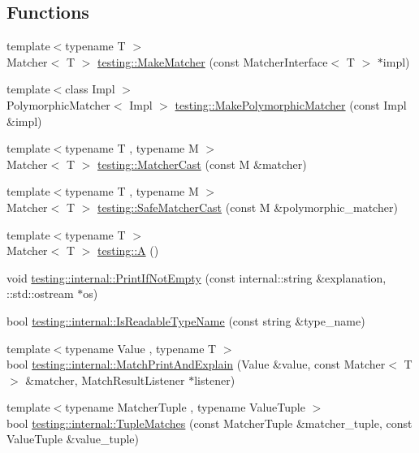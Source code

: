 \subsection*{Functions}
\begin{DoxyCompactItemize}
\item 
{\footnotesize template$<$typename T $>$ }\\Matcher$<$ T $>$ \hyperlink{namespacetesting_a37fd8029ac00e60952440a3d9cca8166}{testing\+::\+Make\+Matcher} (const Matcher\+Interface$<$ T $>$ $\ast$impl)
\item 
{\footnotesize template$<$class Impl $>$ }\\Polymorphic\+Matcher$<$ Impl $>$ \hyperlink{namespacetesting_a667ca94f190ec2e17ee2fbfdb7d3da04}{testing\+::\+Make\+Polymorphic\+Matcher} (const Impl \&impl)
\item 
{\footnotesize template$<$typename T , typename M $>$ }\\Matcher$<$ T $>$ \hyperlink{namespacetesting_a8234d15eee99b135a7fdf2141a2ebe1f}{testing\+::\+Matcher\+Cast} (const M \&matcher)
\item 
{\footnotesize template$<$typename T , typename M $>$ }\\Matcher$<$ T $>$ \hyperlink{namespacetesting_ac016ac22aa065a19b9ef95f0ccffc17b}{testing\+::\+Safe\+Matcher\+Cast} (const M \&polymorphic\+\_\+matcher)
\item 
{\footnotesize template$<$typename T $>$ }\\Matcher$<$ T $>$ \hyperlink{namespacetesting_a5e9134d655d2fc9323902348083282e7}{testing\+::A} ()
\item 
void \hyperlink{namespacetesting_1_1internal_afa4cd5d7933878d6d820b32c87bb2767}{testing\+::internal\+::\+Print\+If\+Not\+Empty} (const internal\+::string \&explanation, \+::std\+::ostream $\ast$os)
\item 
bool \hyperlink{namespacetesting_1_1internal_a19a5d50382569ce6ee94e2b68ddc6fc7}{testing\+::internal\+::\+Is\+Readable\+Type\+Name} (const string \&type\+\_\+name)
\item 
{\footnotesize template$<$typename Value , typename T $>$ }\\bool \hyperlink{namespacetesting_1_1internal_a0821df2611d54c79bac990719ad8a2dd}{testing\+::internal\+::\+Match\+Print\+And\+Explain} (Value \&value, const Matcher$<$ T $>$ \&matcher, Match\+Result\+Listener $\ast$listener)
\item 
{\footnotesize template$<$typename Matcher\+Tuple , typename Value\+Tuple $>$ }\\bool \hyperlink{namespacetesting_1_1internal_a10095d1e1c99369200072b39d657ebc4}{testing\+::internal\+::\+Tuple\+Matches} (const Matcher\+Tuple \&matcher\+\_\+tuple, const Value\+Tuple \&value\+\_\+tuple)

\end{DoxyCompactItemize}
